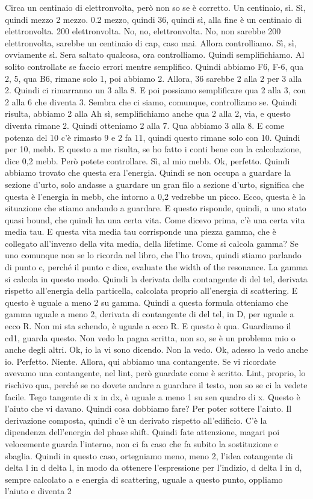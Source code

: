 \begin{soluzione}
{   Circa un centinaio di elettronvolta, però non so se è corretto. Un centinaio, sì. Sì, quindi mezzo 2 mezzo. 0.2 mezzo, quindi 36, quindi sì, alla fine è un centinaio di elettronvolta. 200 elettronvolta. No, no, elettronvolta. No, non sarebbe 200 elettronvolta, sarebbe un centinaio di cap, caso mai. Allora controlliamo. Sì, sì, ovviamente sì. Sera saltato qualcosa, ora controlliamo. Quindi semplifichiamo. Al solito controllate se faccio errori mentre semplifico. Quindi abbiamo F6, F-6, qua 2, 5, qua B6, rimane solo 1, poi abbiamo 2. Allora, 36 sarebbe 2 alla 2 per 3 alla 2. Quindi ci rimarranno un 3 alla 8. E poi possiamo semplificare qua 2 alla 3, con 2 alla 6 che diventa 3. Sembra che ci siamo, comunque, controlliamo se. Quindi risulta, abbiamo 2 alla Ah sì, semplifichiamo anche qua 2 alla 2, via, e questo diventa rimane 2. Quindi otteniamo 2 alla 7. Qua abbiamo 3 alla 8. E come potenza del 10 c'è rimasto 9 e 2 fa 11, quindi questo rimane solo con 10. Quindi per 10, mebb. E questo a me risulta, se ho fatto i conti bene con la calcolazione, dice 0,2 mebb. Però potete controllare. Sì, al mio mebb. Ok, perfetto. Quindi abbiamo trovato che questa era l'energia. Quindi se non occupa a guardare la sezione d'urto, solo andasse a guardare un gran filo a sezione d'urto, significa che questa è l'energia in mebb, che intorno a 0,2 vedrebbe un picco. Ecco, questa è la situazione che stiamo andando a guardare. E questo risponde, quindi, a uno stato quasi bound, che quindi ha una certa vita. Come dicevo prima, c'è una certa vita media tau. E questa vita media tau corrisponde una piezza gamma, che è collegato all'inverso della vita media, della lifetime. Come si calcola gamma? Se uno comunque non se lo ricorda nel libro, che l'ho trova, quindi stiamo parlando di punto c, perché il punto c dice, evaluate the width of the resonance. La gamma si calcola in questo modo. Quindi la derivata della contangente di del tel, derivata rispetto all'energia della particella, calcolata proprio all'energia di scattering. E questo è uguale a meno 2 su gamma. Quindi a questa formula otteniamo che gamma uguale a meno 2, derivata di contangente di del tel, in D, per uguale a ecco R. Non mi sta schendo, è uguale a ecco R. E questo è qua. Guardiamo il cd1, guarda questo. Non vedo la pagna scritta, non so, se è un problema mio o anche degli altri. Ok, io la vi sono dicendo. Non la vedo. Ok, adesso la vedo anche io. Perfetto. Niente. Allora, qui abbiamo una contangente. Se vi ricordate avevamo una contangente, nel lint, però guardate come è scritto. Lint, proprio, lo rischivo qua, perché se no dovete andare a guardare il testo, non so se ci la vedete facile. Tego tangente di x in dx, è uguale a meno 1 su sen quadro di x. Questo è l'aiuto che vi davano. Quindi cosa dobbiamo fare? Per poter sottere l'aiuto. Il derivazione composta, quindi c'è un derivato rispetto all'edificio. C'è la dipendenza dell'energia del phase shift. Quindi fate attenzione, magari poi velocemente guarda l'interno, non ci fa caso che fa subito la sostituzione e sbaglia. Quindi in questo caso, ortegniamo meno, meno 2, l'idea cotangente di delta l in d delta l, in modo da ottenere l'espressione per l'indizio, d delta l in d, sempre calcolato a e energia di scattering, uguale a questo punto, oppliamo l'aiuto e diventa 2 }
\end{soluzione}
